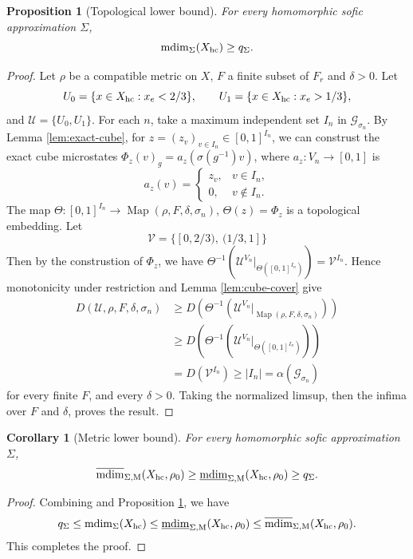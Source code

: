 \documentclass[12pt,a4paper]{amsart}
\newtheorem{proposition}[theorem]{Proposition}
\newtheorem{corollary}[theorem]{Corollary}
\theoremstyle{definition}
\newcommand{\mdim}{\operatorname{mdim}}
\newcommand{\Map}{\operatorname{Map}}
\newcommand{\ind}{\alpha}
\newcommand{\cG}{\mathcal G}
\newcommand{\cU}{\mathcal U}
\newcommand{\cV}{\mathcal V}
\begin{document}
	\begin{proposition}[Topological lower bound]\label{prop:top-lower}
		For every homomorphic sofic approximation $\Sigma$,
		\[
		\mdim_\Sigma(X_{\rm hc})\ge q_\Sigma.
		\]
	\end{proposition}
	
	\begin{proof}
 Let $\rho$ be a compatible metric on $X$, $F$ a finite subset of $F_r$ and $\delta>0$.
		Let
		\[
		U_0=\{x\in X_{\rm hc}:x_e<2/3\},
		\qquad
		U_1=\{x\in X_{\rm hc}:x_e>1/3\},
		\]
		and $\cU=\{U_0,U_1\}$. 
 For each $n$, take a maximum independent set $I_n$ in $\cG_{\sigma_n}$. 
 By Lemma \ref{lem:exact-cube}, for $z=(z_v)_{v\in {I_n}}\in[0,1]^{I_n}$, we can construst the exact cube microstates $\Phi_z(v)_g=a_z(\sigma(g^{-1})v)$, where $a_z:V_n\to[0,1]$ is
		\[
		a_z(v)=\begin{cases}z_v,&v\in {I_n},\\0,&v\notin {I_n}.\end{cases}
		\]
The map $\Theta:[0,1]^{I_n}\to \Map(\rho,F,\delta,\sigma_n)$, $\Theta(z)=\Phi_z$ is a topological embedding.
 Let
		\[
		\cV=\{[0,2/3),\ (1/3,1]\}
		\]
        Then by the construstion of $\Phi_z$, we have $\Theta^{-1}(\cU^{V_n}|_{\Theta([0,1]^{I_n})})=\cV^{I_{n}}$.
 Hence monotonicity under restriction and Lemma \ref{lem:cube-cover} give
		\begin{align*}
		 	D(\cU,\rho,F,\delta,\sigma_n) &\geq D(\Theta^{-1}(\cU^{V_n}|_{\Map(\rho,F,\delta,\sigma_n)}))\\
 &\geq D(\Theta^{-1}(\cU^{V_n}|_{\Theta([0,1]^{I_n})}))\\
 &=D(\cV^{I_{n}})\geq 
		 |I_n|=\ind(\cG_{\sigma_n})   
		\end{align*}
for  every finite $F$, and every $\delta>0$.  Taking the normalized limsup, then the infima over $F$ and $\delta$, proves the result.
	\end{proof}
	
	\begin{corollary}[Metric lower bound]\label{prop:metric-lower}
		For every homomorphic sofic approximation $\Sigma$,
		\[
		\overline{\mdim}_{\Sigma,\mathrm M}(X_{\rm hc},\rho_0)\ge \underline{\mdim}_{\Sigma,\mathrm M}(X_{\rm hc},\rho_0)\ge q_\Sigma.
		\]
	\end{corollary}
	
	\begin{proof}
	Combining \cite[Theorem 6.1]{Li13} and Proposition \ref{prop:top-lower}, we have
    \[ q_\Sigma \leq \mdim_\Sigma(X_{\rm hc}) \leq \underline{\mdim}_{\Sigma,\mathrm M}(X_{\rm hc},\rho_0) \leq \overline{\mdim}_{\Sigma,\mathrm M}(X_{\rm hc},\rho_0).
    \]
      This completes the proof.
	\end{proof}
	
\end{document}
